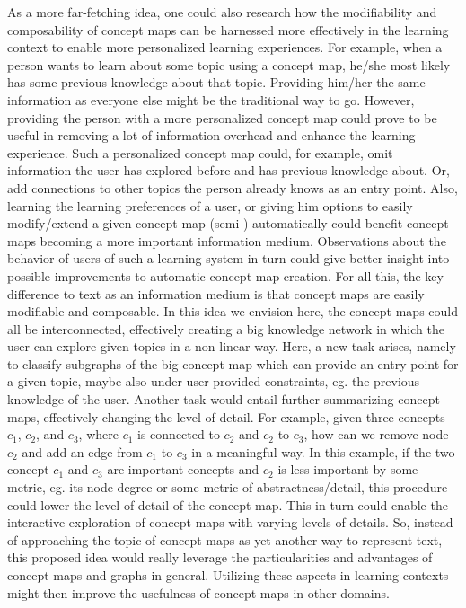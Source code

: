 As a more far-fetching idea, one could also research how the modifiability and composability of concept maps can be harnessed more effectively in the learning context to enable more personalized learning experiences.
For example, when a person wants to learn about some topic using a concept map, he/she most likely has some previous knowledge about that topic.
Providing him/her the same information as everyone else might be the traditional way to go. 
However, providing the person with a more personalized concept map could prove to be useful in removing a lot of information overhead and enhance the learning experience.
Such a personalized concept map could, for example, omit information the user has explored before and has previous knowledge about.
Or, add connections to other topics the person already knows as an entry point.
Also, learning the learning preferences of a user, or giving him options to easily modify/extend a given concept map (semi-) automatically could benefit concept maps becoming a more important information medium.
Observations about the behavior of users of such a learning system in turn could give better insight into possible improvements to automatic concept map creation.
For all this, the key difference to text as an information medium is that concept maps are easily modifiable and composable.
In this idea we envision here, the concept maps could all be interconnected, effectively creating a big knowledge network in which the user can explore given topics in a non-linear way.
Here, a new task arises, namely to classify subgraphs of the big concept map which can provide an entry point for a given topic, maybe also under user-provided constraints, eg. the previous knowledge of the user.
Another task would entail further summarizing concept maps, effectively changing the level of detail.
For example, given three concepts $c_1$, $c_2$, and $c_3$, where $c_1$ is connected to $c_2$ and $c_2$ to $c_3$, how can we remove node $c_2$ and add an edge from $c_1$ to $c_3$ in a meaningful way.
In this example, if the two concept $c_1$ and $c_3$ are important concepts and $c_2$ is less important by some metric, eg. its node degree or some metric of abstractness/detail, this procedure could lower the level of detail of the concept map.
This in turn could enable the interactive exploration of concept maps with varying levels of details.
So, instead of approaching the topic of concept maps as yet another way to represent text, this proposed idea would really leverage the particularities and advantages of concept maps and graphs in general.
Utilizing these aspects in learning contexts might then improve the usefulness of concept maps in other domains.





